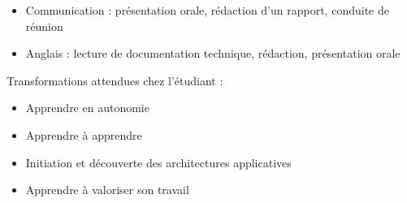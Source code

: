 {\begin{itemize}
\item
  Communication : présentation orale, rédaction d'un rapport, conduite
  de réunion
\item
  Anglais : lecture de documentation technique, rédaction, présentation
  orale
\end{itemize}
Transformations attendues chez l'étudiant :
\begin{itemize}
\item
  Apprendre en autonomie
\item
  Apprendre à apprendre
\item
  Initiation et découverte des architectures applicatives
\item
  Apprendre à valoriser son travail
\end{itemize}
}




